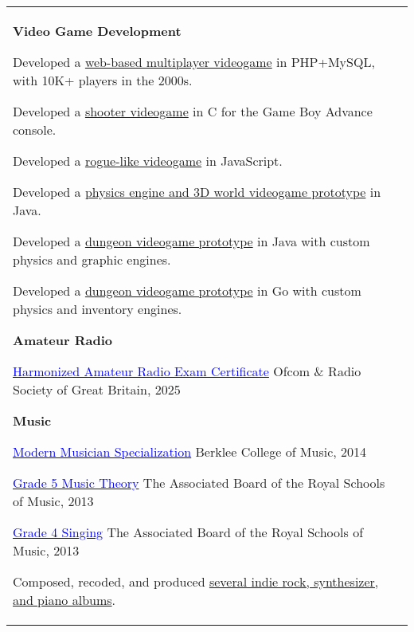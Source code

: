 \documentclass[letterpaper,10pt,oneside]{article}
\newcommand{\DatestampY}[1]{#1}
\newcommand{\itemspacingtwo}{\vspace{0.08cm}}
\newcommand{\sref}[2]{%
    \href{https://0/local/attachments/#1}{\textcolor{blue}{#2}}%
}
\newenvironment{body}
{\par\par
\begin{longtable}{p{0.145\textwidth}p{0.81\textwidth}}}
{\par\end{longtable}\par}
\begin{document}
\begin{body}
\textbf{Video Game Development}
\begin{comp}
\item Developed a \href{https://github.com/lquesada/LifoSource}{web-based multiplayer videogame} in PHP+MySQL, with 10K+ players in the 2000s.
\item Developed a \href{https://github.com/lquesada/SpaceARMy}{shooter videogame} in C for the Game Boy Advance console.
\item Developed a \href{https://cavernal.github.io/cavernal}{rogue-like videogame} in JavaScript.
\item Developed a \href{https://github.com/lquesada/MineWorld}{physics engine and 3D world videogame prototype} in Java.
\item Developed a \href{https://github.com/lquesada/RogueCave}{dungeon videogame prototype} in Java with custom physics and graphic engines.
\item Developed a \href{https://github.com/lquesada/CaveExplorer}{dungeon videogame prototype} in Go with custom physics and inventory engines.
\end{comp}
\itemspacingtwo

\textbf{Amateur Radio}
\begin{comp}
\item \sref{Certificate-HAREC.pdf}{Harmonized Amateur Radio Exam Certificate} \textemdash{ }Ofcom \& Radio Society of Great Britain, \DatestampY{2025}
\end{comp}
\itemspacingtwo

\textbf{Music}
\begin{comp}
\item \sref{Diploma-BerkleeCollege-ModernMusician.pdf}{Modern Musician Specialization} \textemdash{ }Berklee College of Music, \DatestampY{2014}
\item \sref{Diploma-ABRSM-MusicTheory5.pdf}{Grade 5 Music Theory} \textemdash{ }The Associated Board of the Royal Schools of Music, \DatestampY{2013}
\item \sref{Diploma-ABRSM-SingingGrade4.pdf}{Grade 4 Singing} \textemdash{ }The Associated Board of the Royal Schools of Music, \DatestampY{2013}
\item Composed, recoded, and produced \href{https://open.spotify.com/artist/3RPEdOJGGdk3kOnmVq3dgX/discography/all}{several indie rock, synthesizer, and piano albums}.
\end{comp}
\end{body}
\end{document}
